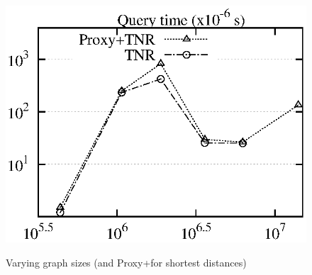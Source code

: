 \begin{figure}[tb!]
\begin{center}
{\includegraphics[scale=0.422]{./exp/query_q7_dist_tnr.eps}}
\end{center}
\vspace{-0.5ex}
\caption{Varying graph sizes (\tnr and Proxy+\tnr for shortest distances)}
\label{fig:performance_dist_graph_size_tnr}
\vspace{-1ex}
\end{figure}




